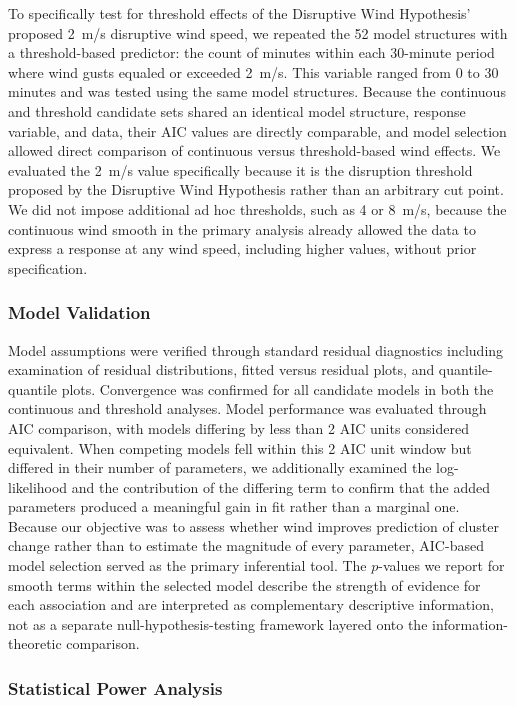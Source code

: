 \documentclass[insects,article,submit,pdftex,moreauthors]{Definitions/mdpi}
\begin{document}
To specifically test for threshold effects of the Disruptive Wind Hypothesis' proposed 2~m/s disruptive wind speed, we repeated the 52 model structures with a threshold-based predictor: the count of minutes within each 30-minute period where wind gusts equaled or exceeded 2~m/s. This variable ranged from 0 to 30 minutes and was tested using the same model structures. Because the continuous and threshold candidate sets shared an identical model structure, response variable, and data, their AIC values are directly comparable, and model selection allowed direct comparison of continuous versus threshold-based wind effects. We evaluated the 2~m/s value specifically because it is the disruption threshold proposed by the Disruptive Wind Hypothesis rather than an arbitrary cut point. We did not impose additional ad hoc thresholds, such as 4 or 8~m/s, because the continuous wind smooth in the primary analysis already allowed the data to express a response at any wind speed, including higher values, without prior specification.

\subsubsection{Model Validation}

Model assumptions were verified through standard residual diagnostics including examination of residual distributions, fitted versus residual plots, and quantile-quantile plots. Convergence was confirmed for all candidate models in both the continuous and threshold analyses. Model performance was evaluated through AIC comparison, with models differing by less than 2 AIC units considered equivalent. When competing models fell within this 2 AIC unit window but differed in their number of parameters, we additionally examined the log-likelihood and the contribution of the differing term to confirm that the added parameters produced a meaningful gain in fit rather than a marginal one. Because our objective was to assess whether wind improves prediction of cluster change rather than to estimate the magnitude of every parameter, AIC-based model selection served as the primary inferential tool. The $p$-values we report for smooth terms within the selected model describe the strength of evidence for each association and are interpreted as complementary descriptive information, not as a separate null-hypothesis-testing framework layered onto the information-theoretic comparison.

\subsubsection{Statistical Power Analysis}
\end{document}
